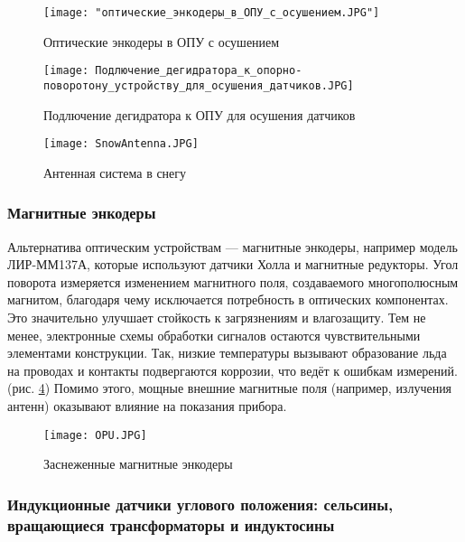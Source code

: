 \begin{figure}[!h] 
    \texttt{[image: "оптические\_энкодеры\_в\_ОПУ\_с\_осушением.JPG"]} 
    \caption{Оптические энкодеры в ОПУ с осушением}
    \label{Degidrator1} 
\end{figure}
   
   
   
\begin{figure}[!h] 
    \texttt{[image: Подлючение\_дегидратора\_к\_опорно-поворотону\_устройству\_для\_осушения\_датчиков.JPG]} 
     \caption{Подлючение дегидратора к ОПУ для осушения датчиков}
  \label{Degidrator2}
\end{figure}

 

  \begin{figure}[!t]
    \centering
    \texttt{[image: SnowAntenna.JPG]}
    \caption{Антенная система в снегу}
    \label{SnowAntenna}
  \end{figure}

 \subsubsection{Магнитные энкодеры}
  
  Альтернатива оптическим устройствам — магнитные энкодеры, например модель ЛИР-ММ137А, 
  которые используют датчики Холла и магнитные редукторы. Угол поворота измеряется изменением магнитного поля, создаваемого многополюсным магнитом, 
  благодаря чему исключается потребность в оптических компонентах. 
  Это значительно улучшает стойкость к загрязнениям и влагозащиту. 
  Тем не менее, электронные схемы обработки сигналов остаются чувствительными элементами конструкции. 
  Так, низкие температуры вызывают образование льда на проводах и контакты подвергаются коррозии, что ведёт к ошибкам измерений.(рис. \ref{OpuInSnow}) 
  Помимо этого, мощные внешние магнитные поля (например, излучения антенн) оказывают влияние на показания прибора.
   \begin{figure}[!t]
    \centering
    \texttt{[image: OPU.JPG]}
    \caption{Заснеженные магнитные энкодеры}
    \label{OpuInSnow}
  \end{figure}

\subsubsection{Индукционные датчики углового положения: сельсины, вращающиеся трансформаторы и индуктосины}

